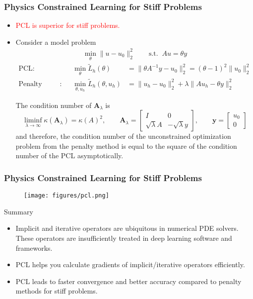\documentclass[usenames,dvipsnames]{beamer}
\begin{document}
\begin{frame}
	\frametitle{Physics Constrained Learning for Stiff Problems}
	
	\begin{itemize}
		\item \textcolor{red}{PCL is superior for stiff problems.}
		\item Consider a model problem 
		\begin{gather*}
			\min_{\theta} \|u-u_0\|^2_2 \qquad \text{s.t.} \;\; Au = \theta y
		\end{gather*}
	\vspace{-0.5cm}
	\begin{align*}
		\text{PCL}: &&\ \min_\theta \tilde L_h(\theta) &= \|\theta A^{-1} y - u_0\|^2_2 = (\theta-1)^2\|u_0\|_2^2\\
				\text{Penalty Method}: &&\ 
			\min_{\theta, u_h}\tilde L_h(\theta, u_h) &= \|u_h-u_0\|^2_2 + \lambda \|Au_h -\theta y\|_2^2
	\end{align*}
\vspace{-0.5cm}
\begin{theorem}
	The condition number of $\mathbf{A}_\lambda$ is 
	\begin{equation*}
		\liminf_{\lambda\rightarrow \infty}\kappa(\mathbf{A}_\lambda)  =  \kappa(A)^2,\qquad \mathbf{A}_\lambda = \begin{bmatrix}
			I & 0\\
			\sqrt{\lambda}A & -\sqrt{\lambda}y
		\end{bmatrix}, \qquad 
		\mathbf{y} = \begin{bmatrix}
			u_0\\ 0
		\end{bmatrix}
	\end{equation*}
	and therefore, the condition number of the unconstrained optimization problem from the penalty method is equal to the square of the condition number of the PCL asymptotically. 
\end{theorem}
 	\end{itemize}
\end{frame}

\begin{frame}
	\frametitle{Physics Constrained Learning for Stiff Problems}
	\begin{figure}[hbt]
		\centering
		\texttt{[image: figures/pcl.png]}
	\end{figure}
\end{frame}


\begin{frame}{Summary}
\begin{itemize}
\item Implicit and iterative operators are ubiquitous in numerical PDE solvers. These operators are insufficiently treated in deep learning software and frameworks.

\item PCL helps you calculate gradients of implicit/iterative operators efficiently. 

\item PCL leads to faster convergence and better accuracy compared to penalty methods for stiff problems.
\end{itemize}
\end{frame}
\end{document}
